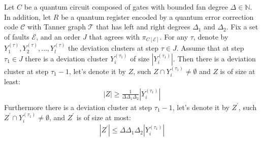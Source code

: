 \begin{claim}
  \label{claim:deviation_clusters}
  Let $C$ be a quantum circuit composed of gates with bounded fan degree $\Delta \in \mathbb{N}$. In addition, let $R$ be a quantum register encoded by a quantum error correction code $\mathcal{C}$ with Tanner graph $\mathcal{T}$ that has left and right degrees $\Delta_{1}$ and $\Delta_{2}$. Fix a set of faults $\mathcal{E}$, and an order $J$ that agrees with $\pi_{C[\mathcal{E}]}$. For any $\tau$, denote by $Y_{1}^{(\tau)}, Y_{2}^{(\tau)}, \ldots, Y_{l}^{(\tau)}$ the deviation clusters at step $\tau \in J$. Assume that at step $\tau_{1} \in J$ there is a deviation cluster $Y_{i}^{(\tau_{1})}$ of size $|Y_{i}^{(\tau_{1})}| $. Then there is a deviation cluster at step $\tau_{1}-1$, let's denote it by $Z$, such $Z \cap Y_{i}^{(\tau_{1})} \neq \emptyset$ and $Z$ is of size at least:
  \begin{equation*}
    \begin{split}
      |Z| \ge \frac{1}{\Delta\Delta_{1}\Delta_{2}} |Y_{i}^{(\tau_{1})}|
    \end{split}
  \end{equation*}
  Furthermore there is a deviation cluster at step $\tau_{1}-1$, let's denote it by $Z^\prime$, such $Z^{\prime} \cap Y_{i}^{(\tau_{1})} \neq \emptyset$, and $Z^{\prime}$ is of size at most:
  \begin{equation*}
    \begin{split}
      |Z^{\prime}| \le \Delta\Delta_{1}\Delta_{2} |Y_{i}^{(\tau_{1})}|
    \end{split}
  \end{equation*}
\end{claim}
